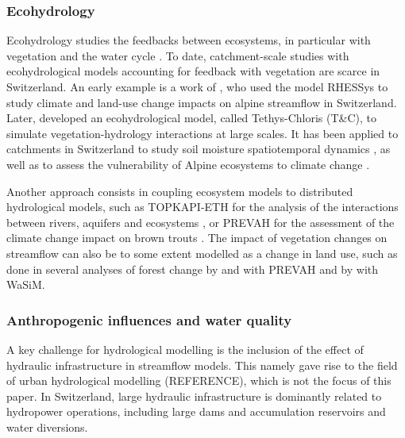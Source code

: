\documentclass[10pt,a4paper]{article}
\begin{document}
\subsubsection{Ecohydrology}
\label{sec:context:ecohydrology}

Ecohydrology studies the feedbacks between ecosystems, in particular with vegetation and the water cycle \citep{Tague2020}. To date, catchment-scale studies with ecohydrological models accounting for feedback with vegetation are scarce in Switzerland. An early example is a work of \citet{Zierl2005}, who used the model RHESSys to study climate and land-use change impacts on alpine streamflow in Switzerland. Later, \citet{Fatichi2012, Fatichi2012a} developed an ecohydrological model, called Tethys-Chloris (T\&C), to simulate vegetation-hydrology interactions at large scales. It has been applied to catchments in Switzerland to study soil moisture spatiotemporal dynamics \citep{Fatichi2015a}, as well as to assess the vulnerability of Alpine ecosystems to climate change \citep{Mastrotheodoros2019}.

Another approach consists in coupling ecosystem models to distributed hydrological models, such as TOPKAPI-ETH for the analysis of the interactions between rivers, aquifers and ecosystems \citep{Foglia2009, Pappas2015}, or PREVAH for the assessment of the climate change impact on brown trouts \citep{Junker2015}. The impact of vegetation changes on streamflow can also be to some extent modelled as a change in land use, such as done in several analyses of forest change by \citet{Koplin2013} and \citet{Schattan2013} with PREVAH and by \citet{Alaoui2014} with WaSiM.


\subsubsection{Anthropogenic influences and water quality}
\label{sec:context:infrastructures}
A key challenge for hydrological modelling is the inclusion of the effect of hydraulic infrastructure in streamflow models. This namely gave rise to the field of urban hydrological modelling (REFERENCE), which is not the focus of this paper.  In Switzerland, large hydraulic infrastructure is dominantly related to hydropower operations, including large dams and accumulation reservoirs and water diversions.
\end{document}

